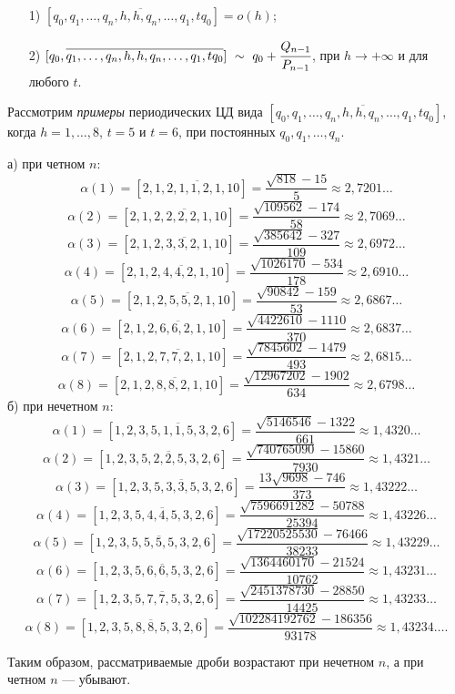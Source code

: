 \begin{corollaryr}\label{PiskunovaTretyakov:cor:3}
\begin{enumerate}
\item[1) ]$[{q_0},\overline{{q_1},\dots,{q_n},{h},{h},{q_n},\dots,{q_1},t{q_0}}]=o(h)$;
\item[2) ]$[{q_0},\overline{{q_1},\dots,{q_n},{h},{h},{q_n},\dots,{q_1},t{q_0}}] \ \sim \ {{q_0}+\cfrac {Q_{n-1}}{P_{n-1}}}$, при ${h\to +\infty}$ и для любого $t$.
\end{enumerate}
\end{corollaryr}


Рассмотрим \emph{примеры} периодических ЦД вида $[{q_0},\overline{{q_1},\dots,{q_n},{h},{h},{q_n},\dots,{q_1},{t{q_0}}}]$,
\newline
когда $h=1,\dots,8$, $t=5$ и $t=6$, при постоянных ${q_0},{q_1},\dots,{q_n}.$

\begin{exampler}
а) при четном $n$:
\[\alpha(1)=[2,\overline{1,2,1,1,2,1,10}]=\frac {\sqrt{818}-15}{5}\approx 2,7201\dots\]
\[\alpha(2)=[2,\overline{1,2,2,2,2,1,10}]=\frac {\sqrt{109562}-174}{58}\approx 2,7069\dots\]
\[\alpha(3)=[2,\overline{1,2,3,3,2,1,10}]=\frac {\sqrt{385642}-327}{109}\approx 2,6972\dots\]
\[\alpha(4)=[2,\overline{1,2,4,4,2,1,10}]=\frac {\sqrt{1026170}-534}{178}\approx 2,6910\dots\]
\[\alpha(5)=[2,\overline{1,2,5,5,2,1,10}]=\frac {\sqrt{90842}-159}{53}\approx 2,6867\dots\]
\[\alpha(6)=[2,\overline{1,2,6,6,2,1,10}]=\frac {\sqrt{4422610}-1110}{370}\approx 2,6837\dots\]
\[\alpha(7)=[2,\overline{1,2,7,7,2,1,10}]=\frac {\sqrt{7845602}-1479}{493}\approx 2,6815\dots\]
\[\alpha(8)=[2,\overline{1,2,8,8,2,1,10}]=\frac {\sqrt{12967202}-1902}{634}\approx 2,6798\dots\]
б) при нечетном $n$:
\[\alpha(1)=[1,\overline{2,3,5,1,1,5,3,2,6}]=\frac {\sqrt{5146546}-1322}{661}\approx 1,4320\dots\]
\[\alpha(2)=[1,\overline{2,3,5,2,2,5,3,2,6}]=\frac {\sqrt{740765090}-15860}{7930}\approx 1,4321\dots\]
\[\alpha(3)=[1,\overline{2,3,5,3,3,5,3,2,6}]=\frac {13\sqrt{9698}-746}{373}\approx 1,43222\dots\]
\[\alpha(4)=[1,\overline{2,3,5,4,4,5,3,2,6}]=\frac {\sqrt{7596691282}-50788}{25394}\approx 1,43226\dots\]
\[\alpha(5)=[1,\overline{2,3,5,5,5,5,3,2,6}]=\frac {\sqrt{17220525530}-76466}{38233}\approx 1,43229\dots\]
\[\alpha(6)=[1,\overline{2,3,5,6,6,5,3,2,6}]=\frac {\sqrt{1364460170}-21524}{10762}\approx 1,43231\dots\]
\[\alpha(7)=[1,\overline{2,3,5,7,7,5,3,2,6}]=\frac {\sqrt{2451378730}-28850}{14425}\approx 1,43233\dots\]
\[\alpha(8)=[1,\overline{2,3,5,8,8,5,3,2,6}]=\frac {\sqrt{102284192762}-186356}{93178}\approx 1,43234\dots.\]
\end{exampler}
Таким образом, рассматриваемые дроби возрастают при нечетном $n$, а при четном $n$ --- убывают.


